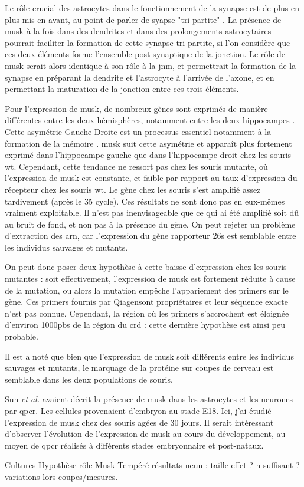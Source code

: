 Le rôle crucial des astrocytes dans le fonctionnement de la synapse est de plus en plus mis en avant, au point de parler de syapse "tri-partite" \cite{Araque1999, Perea2009}. La présence de \gls{musk} à la fois dans des dendrites et dans des prolongements astrocytaires pourrait faciliter la formation de cette synapse tri-partite, si l'on considère que ces deux éléments forme l'ensemble post-synaptique de la jonction. Le rôle de \gls{musk} serait alors identique à son rôle à la \gls{jnm}, et permettrait la formation de la synapse en préparant la dendrite et l'astrocyte à l'arrivée de l'axone, et en permettant la maturation de la jonction entre ces trois éléments.

Pour l'expression de \gls{musk}, de nombreux gènes sont exprimés de manière différentes entre les deux hémisphères, notamment entre les deux hippocampes \cite{Moskal2006}. Cette asymétrie Gauche-Droite est un processus essentiel notamment à la formation de la mémoire \cite{Shimbo2018}. \gls{musk} suit cette asymétrie et apparaît plus fortement exprimé dans l'hippocampe gauche que dans l'hippocampe droit chez les souris \gls{wt}. Cependant, cette tendance ne ressort pas chez les souris mutante, où l'expression de \gls{musk} est constante, et faible par rapport au taux d'expression du récepteur chez les souris \gls{wt}. Le gène chez les souris \mcrd s'est amplifié assez tardivement (après le 35 cycle). Ces résultats ne sont donc pas en eux-mêmes vraiment exploitable. Il n'est pas inenvisageable que ce qui ai été amplifié soit dû au bruit de fond, et non pas à la présence du gène. On peut rejeter un problème d'extraction des \acrshort{arn}, car l'expression du gène rapporteur \gls{26s} est semblable entre les individus sauvages et mutants. 

On peut donc poser deux hypothèse à cette baisse d'expression chez les souris mutantes : soit effectivement, l'expression de \gls{musk} est fortement réduite à cause de la mutation, ou alors la mutation empêche l'appariement des primers sur le gène. Ces primers fournis par Qiagen\texttrademark sont propriétaires et leur séquence exacte n'est pas connue. Cependant, la région où les primers s'accrochent est éloignée d'environ 1000pbs de la région du \gls{crd} : cette dernière hypothèse est ainsi peu probable.

Il est a noté que bien que l'expression de \gls{musk} soit différents entre les individus sauvages et mutants, le marquage de la protéine sur coupes de cerveau est semblable dans les deux populations de souris. 

Sun \emph{et al.} avaient décrit la présence de \gls{musk} dans les astrocytes et les neurones par \gls{qpcr}. Les cellules provenaient d'embryon au stade E18. Ici, j'ai étudié l'expression de \gls{musk} chez des souris agées de 30 jours. Il serait intéressant d'observer l'évolution de l'expression de \gls{musk} au cours du développement, au moyen de \gls{qpcr} réalisés à différents stades embryonnaire et post-nataux.

Cultures
Hypothèse rôle Musk
Tempéré résultats neun : taille effet ? n suffisant ? variations lors coupes/mesures.